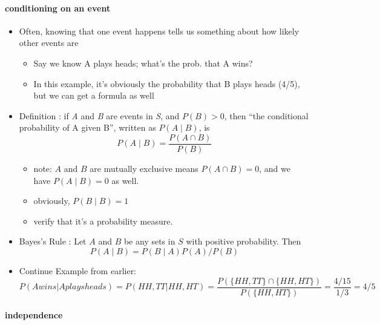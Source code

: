 \paragraph{conditioning on an event}

\begin{itemize}
\item Often, knowing that one event happens tells us something about
        how likely other events are
\begin{itemize}
\item Say we know A plays heads; what's the prob. that A wins?
\item In this example, it's obviously the probability that B plays
          heads (4/5), but we can get a formula as well
\end{itemize}
\item Definition \citep[Definition 1.3.2]{CB02}: if \emph{A} and
  \emph{B} are events in \emph{S}, and $P(B) > 0$, then ``the
  conditional probability of A given B'', written as $P(A ∣ B)$, is
        \[P(A ∣ B) = \frac{P(A ∩ B)}{P(B)}\]
\begin{itemize}
\item note: $A$ and $B$ are mutually exclusive means $P(A ∩
          B) = 0$, and we have $P(A ∣ B) = 0$ as well.
\item obviously, $P(B ∣ B) = 1$
\item verify that it's a probability measure.
\end{itemize}
\item Bayes's Rule \citep[Theorem 1.3.5, which is more complicated]{CB02}:
        Let $A$ and $B$ be any sets in $S$ with positive probability.
        Then \[P(A ∣ B) = P(B ∣ A) P(A) / P(B)\]
\item Continue Example from earlier:
        \[P(A wins | A plays heads) = P({HH, TT} | {HH, HT}) =
        \frac{P(\{HH, TT\} ∩ \{HH, HT\})}{P(\{HH, HT\})} =
        \frac{4/15}{1/3} = 4/5\]
\end{itemize}

\paragraph{independence}

